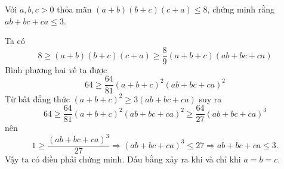 \begin{problem}
	Với $a, b, c > 0$ thỏa mãn $(a + b)(b + c)(c + a) \le 8$, chứng minh rằng $ab + bc + ca \le 3$.
	\solution

	Ta có
	$$
		8 \ge (a + b)(b + c)(c + a) \ge \frac{8}{9}(a + b + c)(ab + bc + ca)	
	$$
	Bình phương hai vế ta được
	$$
		64 \ge \frac{64}{81}(a + b + c)^2(ab + bc + ca)^2
	$$
	Từ bất đẳng thức $(a + b + c)^2 \ge 3(ab + bc + ca)$ suy ra
	$$
		64 \ge \frac{64}{81}(a + b + c)^2(ab + bc + ca)^2 \ge \frac{64}{27}(ab + bc + ca)^3
	$$
	nên
	$$
		1 \ge \frac{(ab + bc + ca)^3}{27} \Rightarrow (ab + bc + ca)^3 \le 27 \Rightarrow 
		ab + bc + ca \le 3.
	$$
	Vậy ta có điều phải chứng minh. Dấu bằng xảy ra khi và chỉ khi $a = b = c$.

\end{problem}